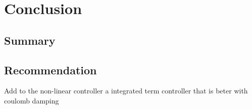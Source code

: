 \chapter{Conclusion}
\label{chp:conclusion}



\section{Summary}
\section{Recommendation}

Add to the non-linear controller a integrated term
controller that is beter with coulomb damping